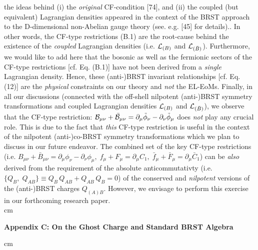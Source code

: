 \documentclass[12pt]{article}
\begin{document}
{{ the ideas behind (i) the {\it original} CF-condition [74], and
(ii) the coupled (but equivalent) Lagrangian densities appeared  in the context of the BRST
approach to the D-dimensional non-Abelian gauge theory (see. e.g. [45] for details).}. In other words, the CF-type restrictions (B.1) are the root-cause behind the
existence of the {\it coupled} Lagrangian densities (i.e. ${\cal L}_{(B)} $ and ${\cal L}_{(\bar B)} $). Furthermore, we would like to add here that the 
bosonic as well as the fermionic sectors of the CF-type restrictions [cf. Eq. (B.1)] have not been derived from a {\it single} Lagrangian density. Hence, these
(anti-)BRST invariant relationships [cf. Eq. (12)] are the {\it physical} constraints on our theory and {\it not} the EL-EoMs.
Finally, in all our discussions (connected with the off-shell nilpotent (anti-)BRST symmetry transformations and coupled 
Lagrangian densities ${\cal L}_{(B)}$ and ${\cal L}_{(\bar B)} $), we observe that the CF-type restriction:
${\cal B}_{\mu\nu} + \bar {\cal B}_{\mu\nu} = \partial_\mu \tilde \phi_\nu - \partial_\nu \tilde \phi_\mu $ does {\it not} play any crucial role.
This is due to the fact that {\it this} CF-type restriction is useful in the context of the nilpotent (anti-)co-BRST symmetry transformations
which we plan to discuss in our future endeavor.  The combined set of the key CF-type restrictions 
(i.e. $B_{\mu\nu} + \bar B_{\mu\nu} = \partial_\mu \phi_\nu - \partial_\nu \phi_\mu, \; f_\mu + F_\mu = \partial_\mu C_1, 
\; \bar f_\mu + \bar F_\mu = \partial_\mu \bar C_1$) can be {\it also} derived from the requirement of the absolute anticommutativty 
(i.e. $\{ Q_B, \; Q_{AB} \} \equiv Q_B\, Q_{AB} + Q_{AB} \, Q_B = 0$) of the 
conserved and {\it nilpotent} versions of the (anti-)BRST charges $Q_{(A)B}$. However,
we envisage to perform this exercise in our forthcoming research paper.\\






 cm 
\begin{center}
{\bf Appendix C: \bf On the Ghost Charge and Standard BRST Algebra}\\
\end{center}

 cm 

}
\end{document}
